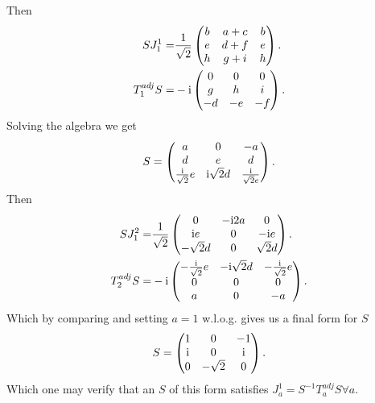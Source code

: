 \documentclass[main.tex]{subfiles}
\begin{document}
Then
\begin{align}
SJ^1_1=&\frac{1}{\sqrt{2}}\begin{pmatrix}  b & a+c & b  \\ e & d+f & e \\ h & g+i & h  \end{pmatrix}.\\
T^{adj}_1S=&-\mathrm{i}\begin{pmatrix}  0 & 0 & 0  \\ g & h & i \\ -d & -e & -f  \end{pmatrix}.
\end{align}
Solving the algebra we get 
\begin{equation}
S=\begin{pmatrix}  a & 0 & -a  \\ d & e & d \\ \frac{\mathrm{i}}{\sqrt{2}}e & \mathrm{i}\sqrt{2}d & \frac{\mathrm{i}}{\sqrt{2}e}  \end{pmatrix}.
\end{equation}
Then 
\begin{align}
SJ^2_1=&\frac{1}{\sqrt{2}}\begin{pmatrix}  0 & -\mathrm{i}2a & 0  \\ \mathrm{i} e & 0 & -\mathrm{i} e \\ -\sqrt{2}d & 0 & \sqrt{2}d  \end{pmatrix}.\\
T^{adj}_2S=&-\mathrm{i}\begin{pmatrix}  -\frac{\mathrm{i}}{\sqrt{2}}e & -\mathrm{i}\sqrt{2}d &  -\frac{\mathrm{i}}{\sqrt{2}}e \\ 0 & 0 & 0 \\ a & 0 & -a  \end{pmatrix}.
\end{align}
Which by comparing and setting $a=1$ w.l.o.g. gives us a final form for $S$
\begin{equation}
S=\begin{pmatrix}  1 & 0 & -1  \\ \mathrm{i} & 0 & \mathrm{i} \\0 & -\sqrt{2} & 0 \end{pmatrix}.
\end{equation}
Which one may verify that an $S$ of this form satisfies $J_a^1=S^{-1}T_a^{adj}S\forall a$.
\end{document}
